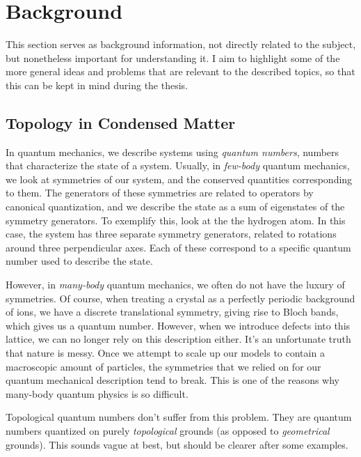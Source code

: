 \section{Background}
This section serves as background information, not directly related to the subject, but nonetheless important for understanding it. I aim to highlight some of the more general ideas and problems that are relevant to the described topics, so that this can be kept in mind during the thesis.
\subsection{Topology in Condensed Matter}

In quantum mechanics, we describe systems using \textit{quantum numbers}, numbers that characterize the state of a system. Usually, in \textit{few-body} quantum mechanics, we look at symmetries of our system, and the conserved quantities corresponding to them. The generators of these symmetries are related to operators by canonical quantization, and we describe the state as a sum of eigenstates of the symmetry generators. To exemplify this, look at the the hydrogen atom. In this case, the system has three separate symmetry generators, related to rotations around three perpendicular axes. Each of these correspond to a specific quantum number used to describe the state.

However, in \textit{many-body} quantum mechanics, we often do not have the luxury of symmetries. Of course, when treating a crystal as a perfectly periodic background of ions, we have a discrete translational symmetry, giving rise to Bloch bands, which gives us a quantum number. However, when we introduce defects into this lattice, we can no longer rely on this description either. It's an unfortunate truth that nature is messy. Once we attempt to scale up our models to contain a macroscopic amount of particles, the symmetries that we relied on for our quantum mechanical description tend to break. This is one of the reasons why many-body quantum physics is so difficult. 

Topological quantum numbers don't suffer from this problem. They are quantum numbers quantized on purely \textit{topological} grounds (as opposed to \textit{geometrical} grounds). This sounds vague at best, but should be clearer after some examples.

